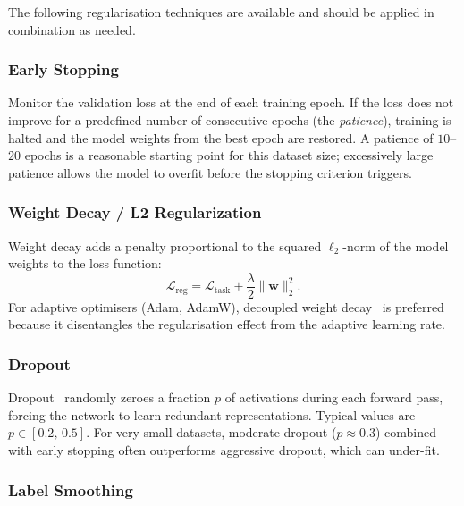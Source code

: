 The following regularisation techniques are available and should be
applied in combination as needed.

\subsubsection{Early Stopping}
\label{sec:overfit:reg:es}

Monitor the validation loss at the end of each training epoch.  If the
loss does not improve for a predefined number of consecutive epochs
(the \emph{patience}), training is halted and the model weights from
the best epoch are restored.  A patience of $10$--$20$ epochs is a
reasonable starting point for this dataset size; excessively large
patience allows the model to overfit before the stopping criterion
triggers.

\subsubsection{Weight Decay / L2 Regularization}
\label{sec:overfit:reg:wd}

Weight decay adds a penalty proportional to the squared $\ell_2$-norm
of the model weights to the loss function:
\begin{equation}
  \mathcal{L}_{\text{reg}} = \mathcal{L}_{\text{task}}
      + \frac{\lambda}{2}\|\mathbf{w}\|_2^2.
  \label{eq:weight_decay}
\end{equation}
For adaptive optimisers (Adam, AdamW), decoupled weight
decay~\cite{loshchilov2017decoupled} is preferred because it disentangles
the regularisation effect from the adaptive learning rate.

\subsubsection{Dropout}
\label{sec:overfit:reg:dropout}

Dropout~\cite{srivastava2014dropout} randomly zeroes a fraction $p$ of
activations during each forward pass, forcing the network to learn
redundant representations.  Typical values are $p \in [0.2,\,0.5]$.
For very small datasets, moderate dropout ($p \approx 0.3$) combined
with early stopping often outperforms aggressive dropout, which can
under-fit.

\subsubsection{Label Smoothing}
\label{sec:overfit:reg:ls}

